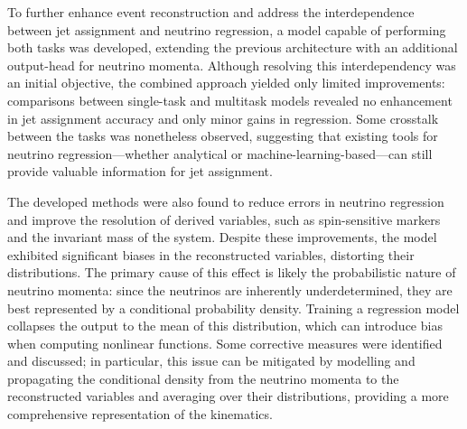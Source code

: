 To further enhance event reconstruction and address the interdependence between jet assignment and neutrino regression, a model capable of performing both tasks was developed, extending the previous architecture with an additional output-head for neutrino momenta. Although resolving this interdependency was an initial objective, the combined approach yielded only limited improvements: comparisons between single-task and multitask models revealed no enhancement in jet assignment accuracy and only minor gains in regression. Some crosstalk between the tasks was nonetheless observed, suggesting that existing tools for neutrino regression—whether analytical or machine-learning-based—can still provide valuable information for jet assignment.

The developed methods were also found to reduce errors in neutrino regression and improve the resolution of derived variables, such as spin-sensitive markers and the invariant mass of the \ttbar system. Despite these improvements, the model exhibited significant biases in the reconstructed variables, distorting their distributions. The primary cause of this effect is likely the probabilistic nature of neutrino momenta: since the neutrinos are inherently underdetermined, they are best represented by a conditional probability density. Training a regression model collapses the output to the mean of this distribution, which can introduce bias when computing nonlinear functions. Some corrective measures were identified and discussed; in particular, this issue can be mitigated by modelling and propagating the conditional density from the neutrino momenta to the reconstructed variables and averaging over their distributions, providing a more comprehensive representation of the kinematics.

